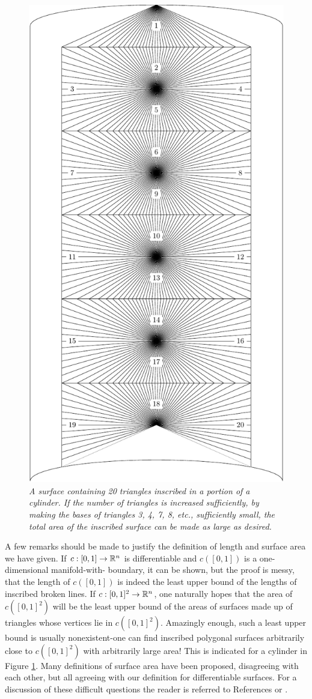 \begin{figure}[!htb]
    \centering
    \includegraphics[width=.75\linewidth]{./pics/Fig5-9.pdf}
    \caption{\textit{A surface containing 20 triangles inscribed in a portion of a cylinder. 
    If the number of triangles is increased sufficiently, by making the bases of triangles 
    3, 4, 7, 8, etc., sufficiently small, the total area of the inscribed surface can be made as 
    large as desired.}}
    \label{Fig 5-9}
\end{figure}

A few remarks should be made to justify the definition of
length and surface area we have given. If $c:[0,1]\to \mathbb{R}^n$ is
differentiable and $c([0,1])$ is a one-dimensional manifold-with-
boundary, it can be shown, but the proof is messy, that the
length of $c([0,1])$ is indeed the least upper bound of the lengths
of inscribed broken lines. If $c:[0,1]^2\to \mathbb{R}^n$, one naturally
hopes that the area of $c([0,1]^2)$ will be the least upper bound of
the areas of surfaces made up of triangles whose vertices lie in
$c([0,1]^2)$. Amazingly enough, such a least upper bound is
usually nonexistent-one can find inscribed polygonal surfaces
arbitrarily close to $c([0,1]^2)$ with arbitrarily large area! This
is indicated for a cylinder in Figure \ref{Fig 5-9}. Many definitions
of surface area have been proposed, disagreeing with each
other, but all agreeing with our definition for differentiable
surfaces. For a discussion of these difficult questions the
reader is referred to References \cite{cesari1956surface} or \cite{rad61948length}.

